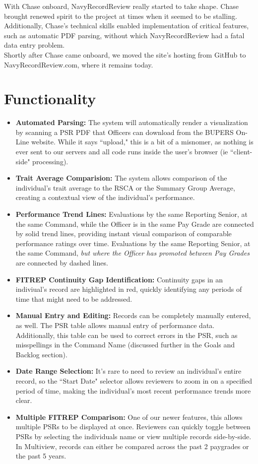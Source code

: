 \documentclass[UTF8]{article}
\begin{document}
With Chase onboard, NavyRecordReview really started to take shape. Chase brought
renewed spirit to the project at times when it seemed to be stalling. Additionally, 
Chase's technical skills enabled implementation of critical features, such as
automatic PDF parsing, without which NavyRecordReview had a fatal data entry 
problem. \\

Shortly after Chase came onboard, we moved the site's hosting from GitHub to 
NavyRecordReview.com, where it remains today.

\section{Functionality}

\begin{itemize}
  \item \textbf{Automated Parsing:} The system will automatically render a 
  visualization by scanning a PSR PDF that Officers can download from the BUPERS
   On-Line website. While it says ``upload," this is a bit of a misnomer, as 
   nothing is ever sent to our servers and all code runs inside the user's 
   browser (ie ``client-side" processing).
  \item \textbf{Trait Average Comparision:} The system allows comparison of the 
  individual's trait average to the RSCA or the Summary Group Average, creating
  a contextual view of the individual's performance.
  \item \textbf{Performance Trend Lines:} Evaluations by the same Reporting 
  Senior, at the same Command, while the Officer is in the same Pay Grade are
  connected by solid trend lines, providing instant visual comparison of 
  comparable performance ratings over time. Evaluations by the same Reporting 
  Senior, at the same Command, \textit{but where the Officer has promoted 
  between Pay Grades} are connected by dashed lines.
  \item \textbf{FITREP Continuity Gap Identification:} Continuity gaps in an 
  indiviual's record are highlighted in red, quickly identifying any periods of
  time that might need to be addressed.
  \item \textbf{Manual Entry and Editing:} Records can be completely manually 
  entered, as well. The PSR table allows manual entry of performance data. 
  Additionally, this table can be used to correct errors in the PSR, such as 
  misspellings in the Command Name (discussed further in the Goals and Backlog 
  section).
  \item \textbf{Date Range Selection:} It's rare to need to review an 
  individual's entire record, so the ``Start Date" selector allows reviewers to
  zoom in on a specified period of time, making the individual's most recent
  performance trends more clear.
  \item \textbf{Multiple FITREP Comparison:} One of our newer features, this 
  allows multiple PSRs to be displayed at once. Reviewers can quickly toggle
  between PSRs by selecting the individuals name or view multiple records 
  side-by-side. In Multiview, records can either be compared across the past
  2 paygrades or the past 5 years.
\end{itemize}
\end{document}
